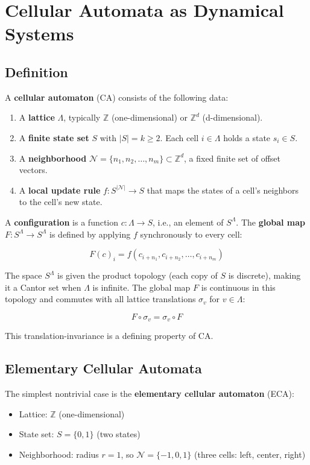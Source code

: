 \chapter{Cellular Automata as Dynamical Systems}

\section{Definition}

A \textbf{cellular automaton} (CA) consists of the following data:

\begin{enumerate}
\item A \textbf{lattice} $\Lambda$, typically $\mathbb{Z}$ (one-dimensional) or $\mathbb{Z}^d$ (d-dimensional).
\item A \textbf{finite state set} $S$ with $|S| = k \geq 2$. Each cell $i \in \Lambda$ holds a state $s_i \in S$.
\item A \textbf{neighborhood} $\mathcal{N} = \{ n_1, n_2, \ldots, n_m\}  \subset \mathbb{Z}^d$, a fixed finite set of offset vectors.
\item A \textbf{local update rule} $f: S^{|\mathcal{N}|} \to S$ that maps the states of a cell's neighbors to the cell's new state.
\end{enumerate}

A \textbf{configuration} is a function $c: \Lambda \to S$, i.e., an element of $S^{\Lambda}$. The \textbf{global map} $F: S^{\Lambda} \to S^{\Lambda}$ is defined by applying $f$ synchronously to every cell:

\[F(c)_i = f(c_{i + n_1}, c_{i + n_2}, \ldots, c_{i + n_m})\]

The space $S^{\Lambda}$ is given the product topology (each copy of $S$ is discrete), making it a Cantor set when $\Lambda$ is infinite. The global map $F$ is continuous in this topology and commutes with all lattice translations $\sigma_v$ for $v \in \Lambda$:

\[F \circ \sigma_v = \sigma_v \circ F\]

This translation-invariance is a defining property of CA.


\section{Elementary Cellular Automata}

The simplest nontrivial case is the \textbf{elementary cellular automaton} (ECA):

\begin{itemize}
\item Lattice: $\mathbb{Z}$ (one-dimensional)
\item State set: $S = \{ 0, 1\} $ (two states)
\item Neighborhood: radius $r = 1$, so $\mathcal{N} = \{ -1, 0, 1\} $ (three cells: left, center, right)
\end{itemize}

